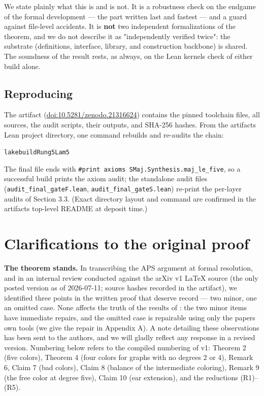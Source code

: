 \documentclass[11pt]{article}
\theoremstyle{definition}
\theoremstyle{remark}
\begin{document}
We state plainly what this is and is not. It is a robustness check on the endgame of the formal development --- the part written last and fastest --- and a guard against file-level accidents. It is \textbf{not} two independent formalizations of the theorem, and we do not describe it as "independently verified twice": the substrate (definitions, interface, library, and construction backbone) is shared. The soundness of the result rests, as always, on the Lean kernel\textquotesingle s check of either build alone.

\subsection{Reproducing}\label{35-reproducing}

The artifact (\href{https://doi.org/10.5281/zenodo.21316624}{doi:10.5281/zenodo.21316624}) contains the pinned toolchain files, all sources, the audit scripts, their outputs, and SHA-256 hashes. From the artifact\textquotesingle s Lean project directory, one command rebuilds and re-audits the chain:

{\small
\begin{alltt}
lake build Rung5Lam5
\end{alltt}
}

The final file ends with \texttt{\#print\ axioms\ SMaj.Synthesis.maj\_\allowbreak le\_\allowbreak five}, so a successful build prints the axiom audit; the standalone audit files (\texttt{audit\_\allowbreak final\_\allowbreak gateF.lean}, \texttt{audit\_\allowbreak final\_\allowbreak gateS.lean}) re-print the per-layer audits of Section 3.3. (Exact directory layout and command are confirmed in the artifact\textquotesingle s top-level README at deposit time.)


\section{Clarifications to the original proof}\label{4-clarifications-to-the-original-proof}

\textbf{The theorem stands.} In transcribing the APS argument at formal resolution, and in an internal review conducted against the arXiv v1 LaTeX source (the only posted version as of 2026-07-11; source hashes recorded in the artifact), we identified three points in the written proof that deserve record --- two minor, one an omitted case. None affects the truth of the results of \cite{APS}: the two minor items have immediate repairs, and the omitted case is repairable using only the paper\textquotesingle s own tools (we give the repair in Appendix A). A note detailing these observations has been sent to the authors, and we will gladly reflect any response in a revised version. Numbering below refers to the compiled numbering of \cite{APS} v1: Theorem 2 (five colors), Theorem 4 (four colors for graphs with no degrees 2 or 4), Remark 6, Claim 7 (bad colors), Claim 8 (balance of the intermediate coloring), Remark 9 (the free color at degree five), Claim 10 (ear extension), and the reductions (R1)--(R5).
\end{document}
